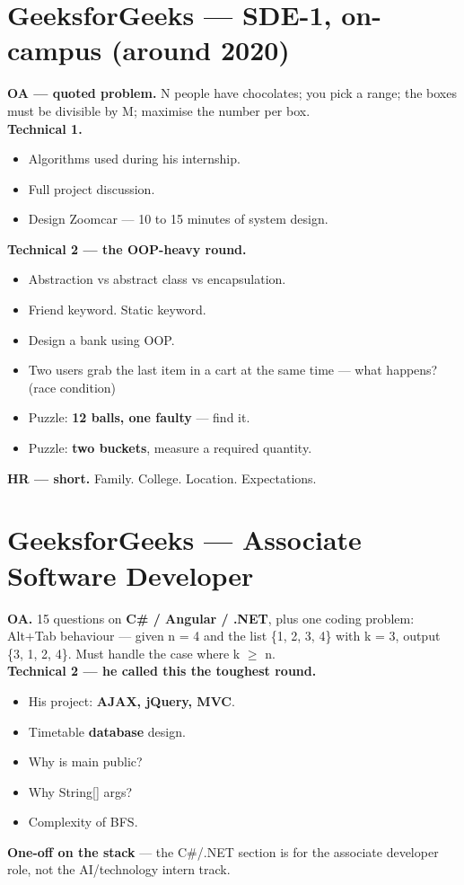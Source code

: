\documentclass[11pt,a4paper]{article}
\newcommand{\tg}[1]{\textcolor{tag}{\textbf{\footnotesize #1}}}
\newcommand{\rnd}[1]{\textcolor{accent}{\textbf{#1}}}
\newcommand{\q}[1]{\textcolor{qcol}{#1}}
\newcommand{\card}[1]{%
  \par\vspace{5pt}%
  \noindent\colorbox{soft}{%
    \parbox{\dimexpr\textwidth-2\fboxsep}{\vspace{6pt}#1\vspace{6pt}}%
  }\par\vspace{7pt}%
}
\begin{document}
\section{GeeksforGeeks --- SDE-1, on-campus (around 2020)}
\card{
\rnd{OA --- quoted problem.} N people have chocolates; you pick a range; the boxes must be divisible by M; maximise the number per box.\\[5pt]
\rnd{Technical 1.}
\begin{itemize}
  \item Algorithms used during his internship.
  \item Full project discussion.
  \item \q{Design Zoomcar} --- 10 to 15 minutes of system design.
\end{itemize}
\vspace{3pt}
\rnd{Technical 2 --- the OOP-heavy round.}
\begin{itemize}
  \item \q{Abstraction vs abstract class vs encapsulation.}
  \item \q{Friend} keyword. \quad \q{Static} keyword.
  \item \q{Design a bank using OOP.}
  \item \q{Two users grab the last item in a cart at the same time --- what happens?} (race condition)
  \item Puzzle: \textbf{12 balls, one faulty} --- find it.
  \item Puzzle: \textbf{two buckets}, measure a required quantity.
\end{itemize}
\vspace{3pt}
\rnd{HR --- short.} Family. \quad College. \quad Location. \quad Expectations.
}

\section{GeeksforGeeks --- Associate Software Developer}
\card{
\rnd{OA.} 15 questions on \textbf{C\# / Angular / .NET}, plus one coding problem:\\[3pt]
\q{Alt+Tab behaviour} --- given n = 4 and the list \{1, 2, 3, 4\} with k = 3, output \{3, 1, 2, 4\}. Must handle the case where k $\geq$ n.\\[5pt]
\rnd{Technical 2 --- he called this the toughest round.}
\begin{itemize}
  \item His project: \textbf{AJAX, jQuery, MVC}.
  \item Timetable \textbf{database} design.
  \item \q{Why is main public?}
  \item \q{Why String[] args?}
  \item \q{Complexity of BFS.}
\end{itemize}
}
\tg{One-off on the stack} --- the C\#/.NET section is for the associate developer role, not the AI/technology intern track.
\end{document}
